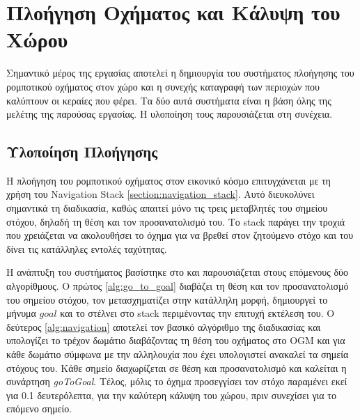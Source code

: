 \section{Πλοήγηση Οχήματος και Κάλυψη του Χώρου}
\label{section:navigation_and_coverage}

Σημαντικό μέρος της εργασίας αποτελεί η δημιουργία του συστήματος πλοήγησης του ρομποτικού οχήματος στον χώρο και η συνεχής καταγραφή των περιοχών που καλύπτουν οι κεραίες που φέρει. Τα δύο αυτά συστήματα είναι η βάση όλης της μελέτης της παρούσας εργασίας. Η υλοποίηση τους παρουσιάζεται στη συνέχεια. 


\subsection{Υλοποίηση Πλοήγησης}
\label{section:navigation_implementation}

Η πλοήγηση του ρομποτικού οχήματος στον εικονικό κόσμο επιτυγχάνεται με τη χρήση του Navigation Stack \ref{section:navigation_stack}. Αυτό διευκολύνει σημαντικά τη διαδικασία, καθώς απαιτεί μόνο τις τρεις μεταβλητές του σημείου στόχου, δηλαδή τη θέση και τον προσανατολισμό του. Το stack παράγει την τροχιά που χρειάζεται να ακολουθήσει το όχημα για να βρεθεί στον ζητούμενο στόχο και του δίνει τις κατάλληλες εντολές ταχύτητας. 

Η ανάπτυξη του συστήματος βασίστηκε στο \cite{navStack} και παρουσιάζεται στους επόμενους δύο αλγορίθμους. Ο πρώτος \ref{alg:go_to_goal} διαβάζει τη θέση και τον προσανατολισμό του σημείου στόχου, τον μετασχηματίζει στην κατάλληλη μορφή, δημιουργεί το μήνυμα $goal$ και το στέλνει στο stack περιμένοντας την επιτυχή εκτέλεση του. Ο δεύτερος \ref{alg:navigation} αποτελεί τον βασικό αλγόριθμο της διαδικασίας και υπολογίζει το τρέχον δωμάτιο διαβάζοντας τη θέση του οχήματος στο OGM και για κάθε δωμάτιο σύμφωνα με την αλληλουχία που έχει υπολογιστεί ανακαλεί τα σημεία στόχους του. Κάθε σημείο διαχωρίζεται σε θέση και προσανατολισμό και καλείται η συνάρτηση \emph{goToGoal}. Τέλος, μόλις το όχημα προσεγγίσει τον στόχο παραμένει εκεί για 0.1 δευτερόλεπτα, για την καλύτερη κάλυψη του χώρου, πριν συνεχίσει για το επόμενο σημείο.


